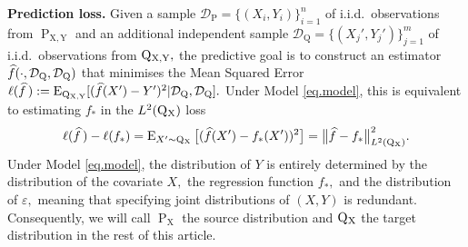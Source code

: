 \documentclass[10pt]{article}
\newcommand{\eps}{\varepsilon}
\newcommand{\mD}{\mathcal{D}}
\newcommand{\E}{\operatorname{E}}
\renewcommand{\P}{\operatorname{P}}
\newcommand{\Q}{\operatorname{Q}}
\newcommand{\X}{\operatorname{X}}
\newcommand{\wh}{\widehat}
\newcommand{\sY}{\mathrm{Y}}
\newcommand{\sX}{\mathrm{X}}
\begin{document}
\noindent\textbf{Prediction loss.} Given a sample $\mD_{\P} = \{(X_i, Y_i)\}_{i=1}^n$ of i.i.d.\ observations from $\P_{\sX, \sY}$ and an additional independent sample $\mD_{\Q} = \{(X_j', Y_j')\}_{j=1}^m$ of i.i.d.\ observations from $\Q\mathstrut_{\!\X, \sY},$ the predictive goal is to construct an estimator $\smash{\wh f}(\cdot, \mD_{\Q}, \mD_{\Q})$ that minimises the Mean Squared Error $\ell(\smash{\wh f}\,) := \E_{\Q\mathstrut_{\!\X, \sY}}[(\smash{\wh f}(X') - Y')^2|\mD_{\Q}, \mD_{\Q}].$ Under Model \eqref{eq.model}, this is equivalent to estimating $f_*$ in the $L^2(\Q\mathstrut_{\!\sX})$ loss 
\begin{align*}
    \ell(\wh f\,) - \ell(f_*) = \E_{X' \sim \Q\mathstrut_{\!\sX}}\big[(\wh f(X') - f_*(X'))^2\big] = \big\|\wh f - f_*\big\|_{L^2(\Q\mathstrut_{\!\sX})}^2.
\end{align*} 
Under Model \eqref{eq.model}, the distribution of $Y$ is entirely determined by the distribution of the covariate $X,$ the regression function $f_*,$ and the distribution of $\eps,$ meaning that specifying joint distributions of $(X, Y)$ is redundant. Consequently, we will call $\P_{\sX}$ the source distribution and $\Q\mathstrut_{\!\sX}$ the target distribution in the rest of this article.\\
\end{document}
